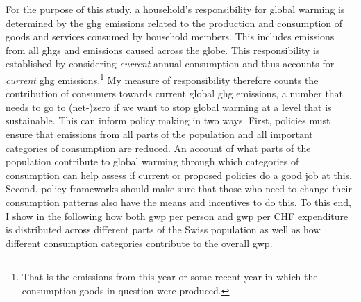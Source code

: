 \documentclass[a4paper,11pt,abstract=true]{scrartcl}
\begin{document}
For the purpose of this study, a household's responsibility for global warming is determined by the \ac{ghg} emissions related to the production and consumption of goods and services consumed by household members.
This includes emissions from all \acp{ghg} and emissions caused across the globe.
This responsibility is established by considering \emph{current} annual consumption and thus accounts for \emph{current} \ac{ghg} emissions.\footnote{%
  That is the emissions from this year or some recent year in which the consumption goods in question were produced.
}
My measure of responsibility therefore counts the contribution of consumers towards current global \ac{ghg} emissions, a number that needs to go to (net-)zero if we want to stop global warming at a level that is sustainable.
This can inform policy making in two ways.
First, policies must ensure that emissions from all parts of the population and all important categories of consumption are reduced.
An account of what parts of the population contribute to global warming through which categories of consumption can help assess if current or proposed policies do a good job at this.
Second, policy frameworks should make sure that those who need to change their consumption patterns also have the means and incentives to do this.
To this end, I show in the following how both \ac{gwp} per person and \ac{gwp} per CHF expenditure is distributed across different parts of the Swiss population as well as how different consumption categories contribute to the overall \ac{gwp}.
\end{document}
